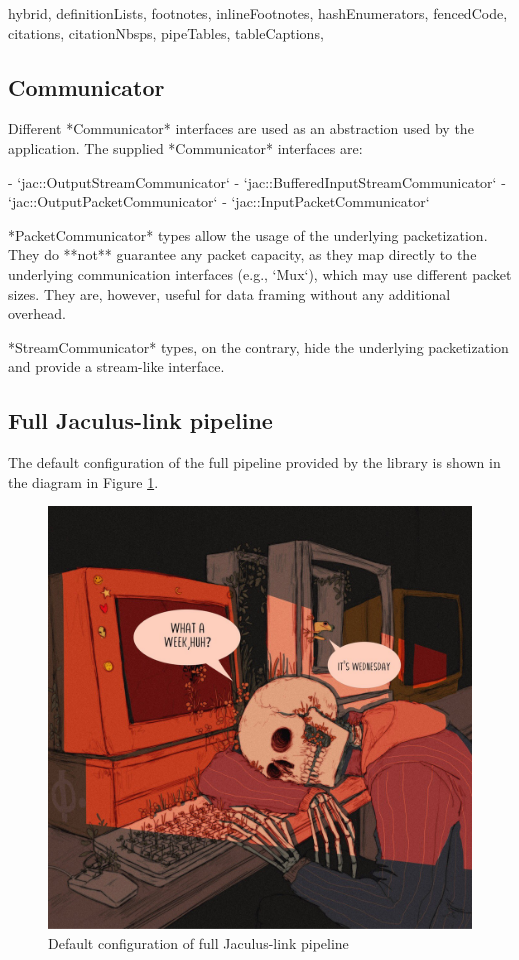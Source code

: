 \documentclass[
  digital,
  oneside,
  nosansbold,
  nocolorbold,
  lof,
  lot
]{fithesis4}
\begin{document}
\begin{markdown*}{%
  hybrid,
  definitionLists,
  footnotes,
  inlineFootnotes,
  hashEnumerators,
  fencedCode,
  citations,
  citationNbsps,
  pipeTables,
  tableCaptions,
}
\subsection{Communicator}

Different *Communicator* interfaces are used as an abstraction used by the application. The supplied *Communicator* interfaces are:

  - `jac::OutputStreamCommunicator`
  - `jac::BufferedInputStreamCommunicator`
  - `jac::OutputPacketCommunicator`
  - `jac::InputPacketCommunicator`

*PacketCommunicator* types allow the usage of the underlying packetization. They do **not** guarantee any packet capacity, as they map directly to the underlying communication interfaces (e.g., `Mux`), which may use different packet sizes. They are, however, useful for data framing without any additional overhead.

*StreamCommunicator* types, on the contrary, hide the underlying packetization and provide a stream-like interface.

\subsection{Full Jaculus-link pipeline}

The default configuration of the full pipeline provided by the library is shown in the diagram in Figure \ref{fig:link-pipeline}.

\begin{figure}[ht]
    \centering
    \includegraphics[width=\textwidth]{link-pipeline}
    \caption{Default configuration of full Jaculus-link pipeline}
    \label{fig:link-pipeline}
\end{figure}



\end{markdown*}
\end{document}
